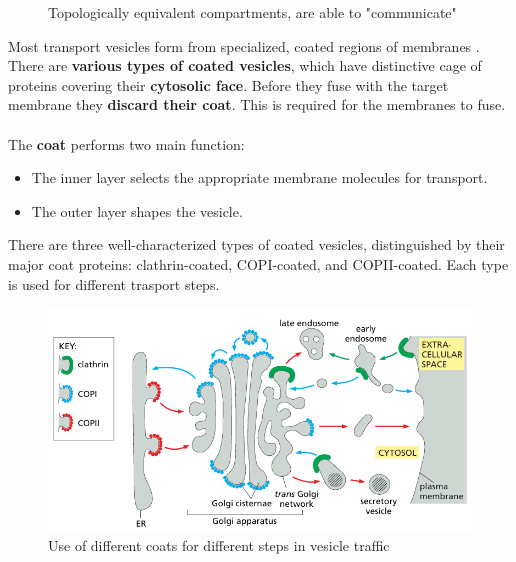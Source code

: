 \documentclass[../main.tex]{subfiles}
\begin{document}
\begin{figure}[H]
	\centering
	\caption{Topologically equivalent compartments, are able to "communicate"}
\end{figure}
\noindent
Most transport vesicles form from specialized, coated regions of membranes . There are \textbf{various types of coated vesicles}, which have distinctive cage of proteins covering their \textbf{cytosolic face}. Before they fuse with the target membrane they \textbf{discard their coat}. This is required for the membranes to fuse. \\
\\
The \textbf{coat} performs two main function: 
\begin{itemize}
	\item The inner layer selects the appropriate membrane molecules for transport.
	\item The outer layer shapes the vesicle.
\end{itemize} 
There are three well-characterized types of coated vesicles, distinguished by their major coat proteins: clathrin-coated, COPI-coated, and COPII-coated. Each type is used for different trasport steps. 

\begin{figure}[H]
	\centering
	\includegraphics[width=0.65 \textwidth]{5}
	\caption{Use of different coats for different steps in vesicle traffic}
\end{figure}
\end{document}

